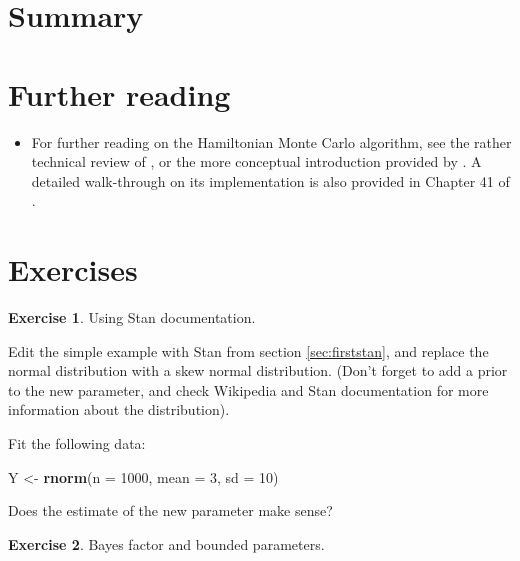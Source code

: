 \documentclass[12pt,]{krantz}
\newenvironment{Shaded}{\begin{snugshade}}{\end{snugshade}}
\newcommand{\KeywordTok}[1]{\textcolor[rgb]{0.13,0.29,0.53}{\textbf{#1}}}
\newcommand{\DataTypeTok}[1]{\textcolor[rgb]{0.13,0.29,0.53}{#1}}
\newcommand{\DecValTok}[1]{\textcolor[rgb]{0.00,0.00,0.81}{#1}}
\newcommand{\StringTok}[1]{\textcolor[rgb]{0.31,0.60,0.02}{#1}}
\newcommand{\NormalTok}[1]{#1}
\providecommand{\tightlist}{%
  \setlength{\itemsep}{0pt}\setlength{\parskip}{0pt}}
\theoremstyle{definition}
\theoremstyle{definition}
\theoremstyle{definition}
\newtheorem{exercise}{Exercise}[chapter]
\theoremstyle{remark}
\begin{document}
\section{Summary}\label{summary-6}

\section{Further reading}\label{further-reading-8}

\begin{itemize}
\tightlist
\item
  For further reading on the Hamiltonian Monte Carlo algorithm, see the
  rather technical review of \citet{betancourt2017conceptual}, or the
  more conceptual introduction provided by
  \citet{monnahanFasterEstimationBayesian2017}. A detailed walk-through
  on its implementation is also provided in Chapter 41 of
  \citet{mackay2003information}.
\end{itemize}

\section{Exercises}\label{exercises-7}

\begin{exercise}
\protect\hypertarget{exr:skewstan}{}{\label{exr:skewstan} }Using Stan
documentation. \end{exercise}

Edit the simple example with Stan from section \ref{sec:firststan}, and
replace the normal distribution with a skew normal distribution. (Don't
forget to add a prior to the new parameter, and check Wikipedia and Stan
documentation for more information about the distribution).

Fit the following data:

\begin{Shaded}
\begin{Highlighting}[]
\NormalTok{Y <-}\StringTok{ }\KeywordTok{rnorm}\NormalTok{(}\DataTypeTok{n =} \DecValTok{1000}\NormalTok{, }\DataTypeTok{mean =} \DecValTok{3}\NormalTok{, }\DataTypeTok{sd =} \DecValTok{10}\NormalTok{)}
\end{Highlighting}
\end{Shaded}

Does the estimate of the new parameter make sense?

\begin{exercise}
\protect\hypertarget{exr:lognstan}{}{\label{exr:lognstan} }Bayes factor and
bounded parameters. \end{exercise}
\end{document}
